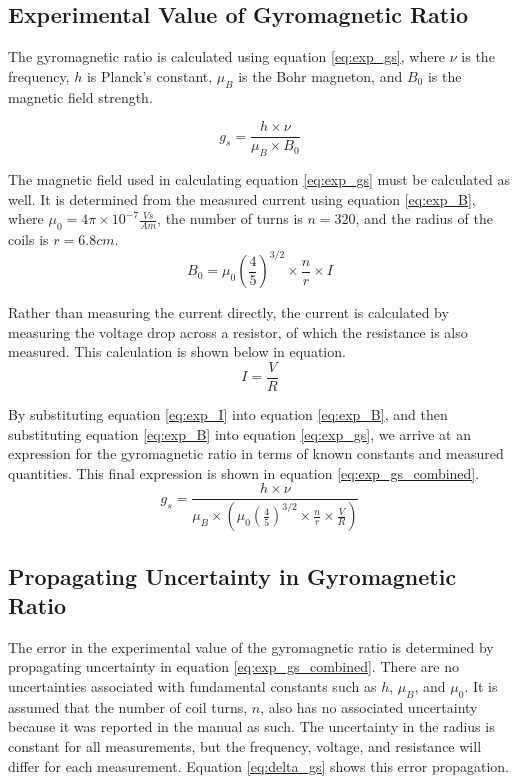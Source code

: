 \documentclass[a4paper]{article}
\begin{document}
\subsection{Experimental Value of Gyromagnetic Ratio}
\qq The gyromagnetic ratio is calculated using equation \ref{eq:exp_gs},
where $\nu$ is the frequency, $h$ is Planck's constant, $\mu_B$ is the
Bohr magneton, and $B_0$ is the magnetic field strength.

\begin{equation}
\label{eq:exp_gs}
g_s = \frac{h \times \nu}{\mu_B \times B_0}
\end{equation}

\qq The magnetic field used in calculating equation \ref{eq:exp_gs}
must be calculated as well. It is determined from the measured current
using equation \ref{eq:exp_B}, where $\mu_0 = 4 \pi \times 10^{-7}
\frac{Vs}{Am}$, the number of turns is $n=320$, and the radius of the
coils is $r=6.8cm$.
\begin{equation}
\label{eq:exp_B}
B_0 = \mu_0 \left( \frac{4}{5} \right) ^{3/2} \times \frac{n}{r} \times I
\end{equation}

\qq Rather than measuring the current directly, the current is
calculated by measuring the voltage drop across a resistor, of which
the resistance is also measured. This calculation is shown below in
equation.
\begin{equation}
\label{eq:exp_I}
I = \frac{V}{R}
\end{equation}

\qq By substituting equation \ref{eq:exp_I} into equation \ref{eq:exp_B}, and
then substituting equation \ref{eq:exp_B} into equation
\ref{eq:exp_gs}, we arrive at an expression for the gyromagnetic ratio
in terms of known constants and measured quantities. This final
expression is shown in equation \ref{eq:exp_gs_combined}.
\begin{equation}
\label{eq:exp_gs_combined}
g_s = \frac{h \times \nu}{\mu_B \times \left( \mu_0 \left( \frac{4}{5}
  \right) ^{3/2} \times \frac{n}{r} \times \frac{V}{R} \right) }
\end{equation}

\subsection{Propagating Uncertainty in Gyromagnetic Ratio}
\qq The error in the experimental value of the gyromagnetic ratio is
determined by propagating uncertainty in equation
\ref{eq:exp_gs_combined}. There are no uncertainties associated with
fundamental constants such as $h$, $\mu_B$, and $\mu_0$. It is assumed
that the number of coil turns, $n$, also has no associated uncertainty
because it was reported in the manual as such. The uncertainty in the
radius is constant for all measurements, but the frequency, voltage,
and resistance will differ for each measurement. Equation
\ref{eq:delta_gs} shows this error propagation.
\end{document}
